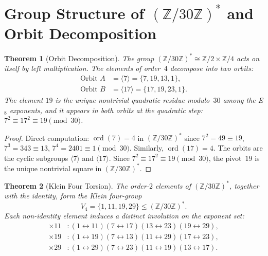 \documentclass[11pt]{amsart}
\theoremstyle{plain}
\newtheorem{theorem}{Theorem}[section]
\theoremstyle{definition}
\theoremstyle{remark}
\newcommand{\ord}{\operatorname{ord}}
\begin{document}
\section{Group Structure of $(\mathbb{Z}/30\mathbb{Z})^*$ and Orbit Decomposition}
\label{sec:orbits}

\begin{theorem}[Orbit Decomposition]\label{thm:orbit-decomp}
The group $(\mathbb{Z}/30\mathbb{Z})^* \cong \mathbb{Z}/2 \times \mathbb{Z}/4$
acts on itself by left multiplication.  The elements of order~$4$ decompose
into two orbits:
\begin{align}
  \text{Orbit } A &= \langle 7 \rangle = \{7, 19, 13, 1\},
    \label{eq:orbitA} \\
  \text{Orbit } B &= \langle 17 \rangle = \{17, 19, 23, 1\}.
    \label{eq:orbitB}
\end{align}
The element $19$ is the unique nontrivial quadratic residue modulo~$30$
among the E$_8$ exponents, and it appears in both orbits at the
quadratic step: $7^2 \equiv 17^2 \equiv 19 \pmod{30}$.
\end{theorem}

\begin{proof}
Direct computation: $\ord(7) = 4$ in $(\mathbb{Z}/30\mathbb{Z})^*$
since $7^2 = 49 \equiv 19$, $7^3 = 343 \equiv 13$, $7^4 = 2401 \equiv 1
\pmod{30}$.  Similarly, $\ord(17) = 4$.  The orbits are the cyclic
subgroups $\langle 7 \rangle$ and $\langle 17 \rangle$.  Since
$7^2 \equiv 17^2 \equiv 19 \pmod{30}$, the pivot~$19$ is the unique
nontrivial square in $(\mathbb{Z}/30\mathbb{Z})^*$.
\end{proof}

\begin{theorem}[Klein Four Torsion]\label{thm:klein-four}
The order-$2$ elements of $(\mathbb{Z}/30\mathbb{Z})^*$, together with
the identity, form the Klein four-group
\[
  V_4 = \{1, 11, 19, 29\} \le (\mathbb{Z}/30\mathbb{Z})^*.
\]
Each non-identity element induces a distinct involution on the exponent set:
\begin{align*}
  \times 11 &\colon (1\leftrightarrow 11)(7\leftrightarrow 17)
    (13 \leftrightarrow 23)(19 \leftrightarrow 29), \\
  \times 19 &\colon (1\leftrightarrow 19)(7\leftrightarrow 13)
    (11 \leftrightarrow 29)(17 \leftrightarrow 23), \\
  \times 29 &\colon (1\leftrightarrow 29)(7\leftrightarrow 23)
    (11 \leftrightarrow 19)(13 \leftrightarrow 17).
\end{align*}
\end{theorem}
\end{document}
